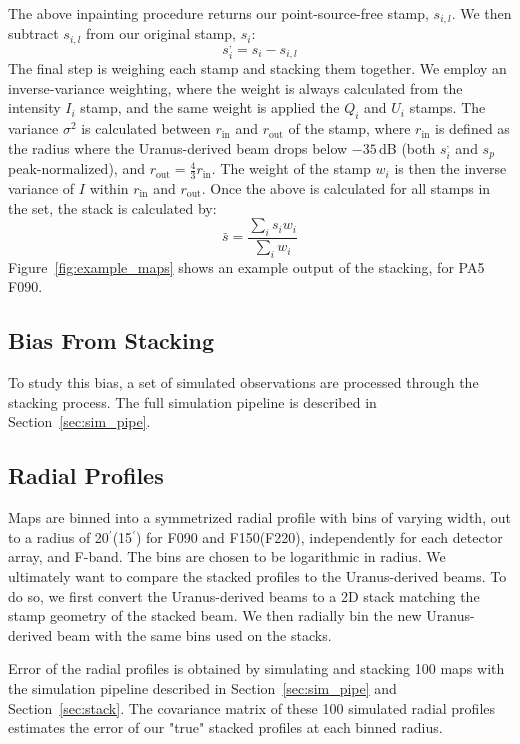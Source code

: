 The above inpainting procedure returns our point-source-free stamp, $s_{i,l}$.  We then subtract $s_{i,l}$ from our original stamp, $s_i$:
\begin{equation}
    s_i^{,} = s_i - s_{i,l}
\end{equation}
The final step is weighing each stamp and stacking them together.  We employ an inverse-variance weighting, where the weight is always calculated from the intensity $I_i$ stamp, and the same weight is applied the $Q_i$ and $U_i$ stamps.  The variance $\sigma^2$ is calculated between $r_{\text{in}}$ and $r_{\text{out}}$ of the stamp, where $r_{\text{in}}$ is defined as the radius where the Uranus-derived beam drops below $-35$\,dB (both $s_i^{,}$ and $s_p$ peak-normalized), and $r_{\text{out}}=\frac{4}{3}r_{\text{in}}$.  The weight of the stamp $w_i$ is then the inverse variance of $I$ within $r_{\text{in}}$ and $r_{\text{out}}$.  Once the above is calculated for all stamps in the set, the stack is calculated by:
\begin{equation}
    \bar{s} = \frac{\sum_i s_i w_i }{\sum_i w_i}
\end{equation}
Figure~\ref{fig:example_maps} shows an example output of the stacking, for PA5 F090.  

\subsection{Bias From Stacking}
\label{subsec:bias}
To study this bias, a set of simulated observations are processed through the stacking process.  The full simulation pipeline is described in Section~\ref{sec:sim_pipe}.

\subsection{Radial Profiles}
\label{subsec:profs}
Maps are binned into a symmetrized radial profile with bins of varying width, out to a radius of 20$^{\prime}$(15$^{\prime}$) for F090 and F150(F220), independently for each detector array, and F-band.  The bins are chosen to be logarithmic in radius.  We ultimately want to compare the stacked profiles to the Uranus-derived beams.  To do so, we first convert the Uranus-derived beams to a 2D stack matching the stamp geometry of the stacked beam.  We then radially bin the new Uranus-derived beam with the same bins used on the stacks.

Error of the radial profiles is obtained by simulating and stacking 100 maps with the simulation pipeline described in Section~\ref{sec:sim_pipe} and Section~\ref{sec:stack}.  The covariance matrix of these 100 simulated radial profiles estimates the error of our "true" stacked profiles at each binned radius.

